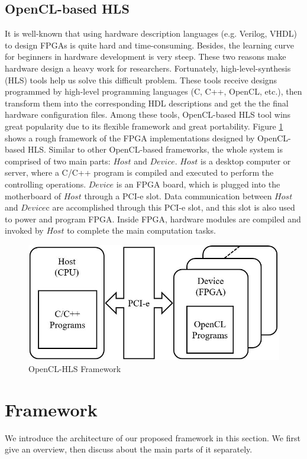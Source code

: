 \documentclass{acm_proc_article-sp-copy}
\begin{document}
\subsection{OpenCL-based HLS}
It is well-known that using hardware description languages (e.g. Verilog, VHDL) to design FPGAs is quite hard and time-consuming. Besides, the learning curve for beginners in hardware development is very steep. These two reasons make hardware design a heavy work for researchers. Fortunately, high-level-synthesis (HLS) tools help us solve this difficult problem. These tools receive designs programmed by high-level programming languages (C, C++, OpenCL, etc.), then transform them into the corresponding HDL descriptions and get the the final hardware configuration files. Among these tools, OpenCL-based HLS tool wins great popularity due to its flexible framework and great portability. Figure \ref{OpenCL-HLS} shows a rough framework of the FPGA implementations designed by OpenCL-based HLS. Similar to other OpenCL-based frameworks, the whole system is comprised of two main parts: $Host$ and $Device$. $Host$ is a desktop computer or server, where a C/C++ program is compiled and executed to perform the controlling operations. $Device$ is an FPGA board, which is plugged into the motherboard of $Host$ through a PCI-e slot. Data communication between $Host$ and $Device$c are accomplished through this PCI-e slot, and this slot is also used to power and program FPGA. Inside FPGA, hardware modules are compiled and invoked by $Host$ to complete the main computation tasks.

\begin{figure}
\centering
\includegraphics[width=1.0\linewidth]{./figure/OpenCL-HLS.jpg}
\caption{OpenCL-HLS Framework}
\label{OpenCL-HLS}
\end{figure}

\section{Framework}
We introduce the architecture of our proposed framework in this section. We first give an overview, then discuss about the main parts of it separately.
\end{document}
